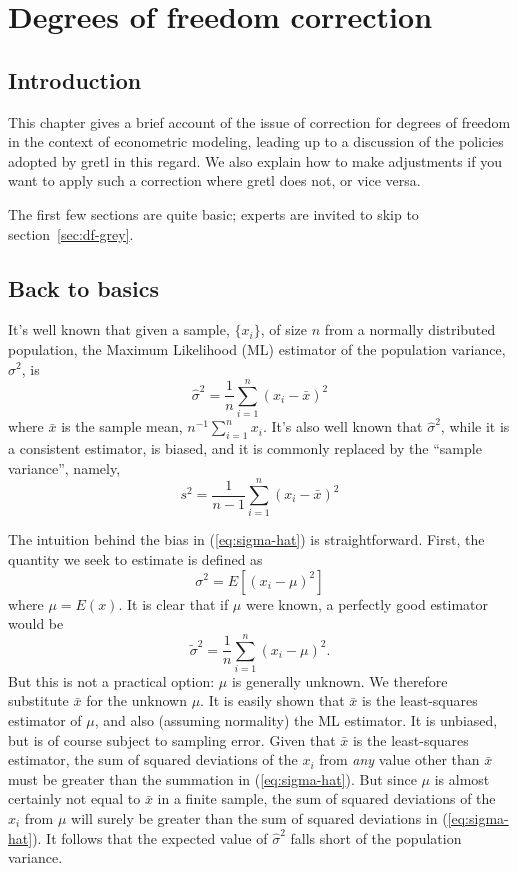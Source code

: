 \chapter{Degrees of freedom correction}
\label{chap:df}


\section{Introduction}

This chapter gives a brief account of the issue of correction for
degrees of freedom in the context of econometric modeling, leading up to
a discussion of the policies adopted by gretl in this regard.  We also
explain how to make adjustments if you want to apply such a correction
where gretl does not, or vice versa.

The first few sections are quite basic; experts are invited to skip to
section~\ref{sec:df-grey}.

\section{Back to basics}
\label{sec:df-basics}

It's well known that given a sample, $\{x_i\}$, of size $n$ from a
normally distributed population, the Maximum Likelihood (ML) estimator
of the population variance, $\sigma^2$, is
%
\begin{equation}
\label{eq:sigma-hat}
\hat{\sigma}^2 = \frac{1}{n} \sum_{i=1}^n (x_i - \bar{x})^2
\end{equation}
%
where $\bar{x}$ is the sample mean, $n^{-1} \sum_{i=1}^n x_i$.  It's
also well known that $\hat{\sigma}^2$, while it is a consistent
estimator, is biased, and it is commonly replaced by the ``sample
variance'', namely,
%
\begin{equation}
\label{eq:sample-variance}
s^2 = \frac{1}{n-1} \sum_{i=1}^n (x_i - \bar{x})^2
\end{equation}

The intuition behind the bias in (\ref{eq:sigma-hat}) is
straightforward.  First, the quantity we seek to estimate is defined
as
%
\[
\sigma^2 = E\left[(x_i - \mu)^2\right]
\]
%
where $\mu = E(x)$. It is clear that if $\mu$ were known, a perfectly
good estimator would be
%
\[
\tilde{\sigma}^2 = \frac{1}{n} \sum_{i=1}^n (x_i - \mu)^2.
\]
%
But this is not a practical option: $\mu$ is generally unknown. We
therefore substitute $\bar{x}$ for the unknown $\mu$. It is easily shown
that $\bar{x}$ is the least-squares estimator of $\mu$, and also
(assuming normality) the ML estimator.  It is unbiased, but is of course
subject to sampling error.  Given that $\bar{x}$ is the least-squares
estimator, the sum of squared deviations of the $x_i$ from \textit{any}
value other than $\bar{x}$ must be greater than the summation in
(\ref{eq:sigma-hat}).  But since $\mu$ is almost certainly not equal to
$\bar{x}$ in a finite sample, the sum of squared deviations of the $x_i$
from $\mu$ will surely be greater than the sum of squared deviations in
(\ref{eq:sigma-hat}). It follows that the expected value of
$\hat{\sigma}^2$ falls short of the population variance.

